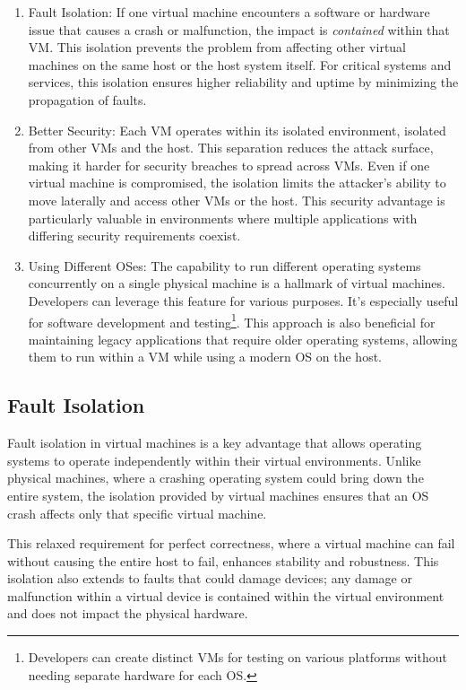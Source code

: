 \documentclass{report}
\begin{document}
\begin{enumerate}[label=\textit{(\roman*)}]
\item Fault Isolation: If one virtual machine encounters a software or hardware issue that causes a
  crash or malfunction, the impact is \textit{contained} within that VM. This isolation prevents the
  problem from affecting other virtual machines on the same host or the host system itself. For
  critical systems and services, this isolation ensures higher reliability and uptime by minimizing
  the propagation of faults.
\item Better Security: Each VM operates within its isolated environment, isolated from other VMs and
  the host. This separation reduces the attack surface, making it harder for security breaches to
  spread across VMs. Even if one virtual machine is compromised, the isolation limits the attacker's
  ability to move laterally and access other VMs or the host. This security advantage is particularly
  valuable in environments where multiple applications with differing security requirements coexist.
\item Using Different OSes: The capability to run different operating systems concurrently on a
  single physical machine is a hallmark of virtual machines. Developers can leverage this feature for
  various purposes. It's especially useful for software development and testing\footnote{Developers
    can create distinct VMs for testing on various platforms without needing separate hardware for each
    OS.}. This approach is also beneficial for maintaining legacy applications that require older
  operating systems, allowing them to run within a VM while using a modern OS on the host.
\end{enumerate}


\subsection{Fault Isolation}
Fault isolation in virtual machines is a key advantage that allows operating systems to operate
independently within their virtual environments. Unlike physical machines, where a crashing
operating system could bring down the entire system, the isolation provided by virtual machines
ensures that an OS crash affects only that specific virtual machine.

This relaxed requirement for perfect correctness, where a virtual machine can fail without causing
the entire host to fail, enhances stability and robustness. This isolation also extends to faults
that could damage devices; any damage or malfunction within a virtual device is contained within the
virtual environment and does not impact the physical hardware.
\end{document}
